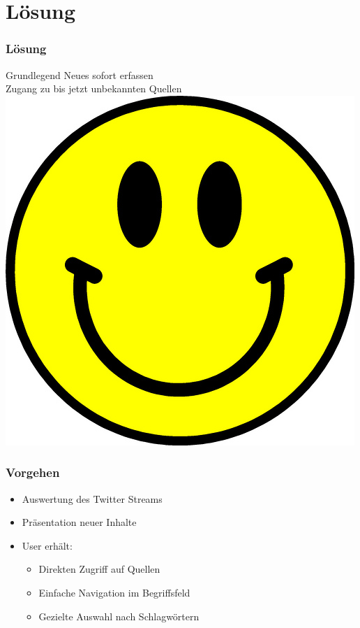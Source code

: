 \documentclass{beamer}
\begin{document}
\section{Lösung}
\begin{frame}
  \frametitle{Lösung}
  \begin{center}
    Grundlegend Neues sofort erfassen \pause \\
    Zugang zu bis jetzt unbekannten Quellen \pause \\
    \includegraphics[height=.4\textheight]{happy}     
  \end{center}
\end{frame}

\begin{frame}
  \frametitle{Vorgehen}
  \begin{itemize}
    \item Auswertung des Twitter Streams
    \item Präsentation neuer Inhalte
    \item User erhält:
    \begin{itemize}
      \item Direkten Zugriff auf Quellen
      \item Einfache Navigation im Begriffsfeld
      \item Gezielte Auswahl nach Schlagwörtern
    \end{itemize}
  \end{itemize}

\end{frame}
\end{document}
